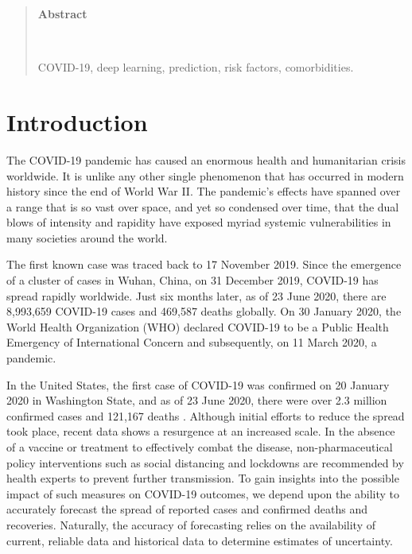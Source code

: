 \documentclass[12pt]{article}
\theoremstyle{definition}
\renewcommand{\_}{%
    \textunderscore\hspace{0pt}%
}
\begin{document}
\begin{quotation}
\centerline{\bfseries{\fontsize{14pt}{1em}\selectfont Abstract}}\par
\setlength{\parindent}{3.22cm}
{\fontsize{12pt}{1.07em}\selectfont~~\ABSTRACT}

\vspace{12pt}
COVID-19, deep learning, prediction, risk factors, comorbidities.
\par
\end{quotation}\par

\def\thefigure{\arabic{figure}}
\def\thetable{\arabic{table}}

\renewcommand{\theequation}{\thesection.\arabic{equation}}

\fontsize{12}{1.07em}\selectfont

\setcounter{section}{0} %
\setcounter{equation}{0} %


\section{Introduction}

The COVID-19 pandemic has caused an enormous health and humanitarian
crisis worldwide. It is unlike any other single phenomenon that has
occurred in modern history since the end of World War II.  The
pandemic’s effects have spanned over a range that is so vast over
space, and yet so condensed over time, that the dual blows of
intensity and rapidity have exposed myriad systemic vulnerabilities in
many societies around the world.

The first known case was traced back to 17 November 2019. Since the
emergence of a cluster of cases in Wuhan, China, on 31 December 2019,
COVID-19 has spread rapidly worldwide. Just six months later, as of 23
June 2020, there are 8,993,659 COVID-19 cases and 469,587 deaths
globally. On 30 January 2020, the World Health Organization (WHO)
\cite{www-who} declared COVID-19 to be a Public Health Emergency of
International Concern and subsequently, on 11 March 2020, a pandemic.

In the United States, the first case of COVID-19 was confirmed on 20
January 2020 in Washington State, and as of 23 June 2020, there were
over 2.3 million confirmed cases and 121,167 deaths
\cite{www-nyt-map}.  Although initial efforts to reduce the spread
took place, recent data shows a resurgence at an increased scale. In
the absence of a vaccine or treatment to effectively combat the
disease, non-pharmaceutical policy interventions such as social
distancing and lockdowns are recommended by health experts to prevent
further transmission. To gain insights into the possible impact of
such measures on COVID-19 outcomes, we depend upon the ability to
accurately forecast the spread of reported cases and confirmed deaths
and recoveries. Naturally, the accuracy of forecasting relies on the
availability of current, reliable data and historical data to
determine estimates of uncertainty.
\end{document}
